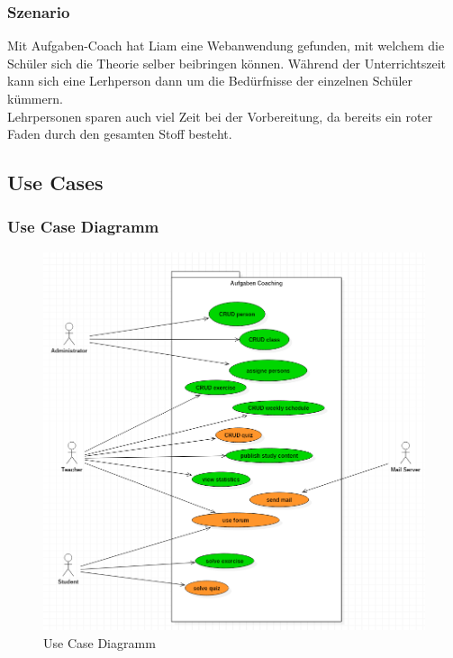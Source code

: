 \subsubsection*{Szenario}
Mit Aufgaben-Coach hat Liam eine Webanwendung gefunden, mit welchem die Schüler sich die Theorie selber beibringen können. Während der Unterrichtszeit kann sich eine Lerhperson dann um die Bedürfnisse der einzelnen Schüler kümmern. \\
Lehrpersonen sparen auch viel Zeit bei der Vorbereitung, da bereits ein roter Faden durch den gesamten Stoff besteht.

\subsection{Use Cases}

\subsubsection{Use Case Diagramm}
\begin{minipage}{\textwidth}

\begin{figure}[H]
	\includegraphics[width=\textwidth, height=\textheight, keepaspectratio]{images/UseCaseDiagramm.png}
	\caption{Use Case Diagramm}
\end{figure}

\end{minipage}


